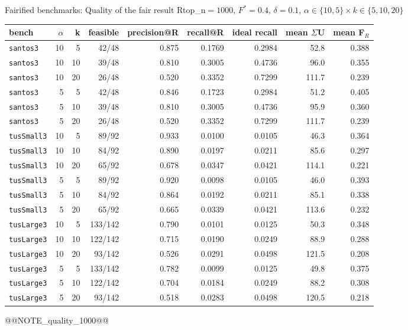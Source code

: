 \begin{frame}{Fairified benchmarks: Quality of the fair result R}{top\_n$=1000$, $F^*{=}0.4$, $\delta{=}0.1$, $\alpha\in\{10,5\}\times k\in\{5,10,20\}$}
\tiny
\begin{center}
\setlength{\tabcolsep}{2.5pt}
\begin{tabular}{lrrrrrrrr}
\toprule
bench & $\alpha$ & k & feasible & precision@R & recall@R & ideal recall & mean $\Sigma$U & mean F$_R$ \\
\midrule
\texttt{santos3} & 10 & 5 & 42/48 & 0.875 & 0.1769 & 0.2984 & 52.8 & 0.388 \\
\texttt{santos3} & 10 & 10 & 39/48 & 0.810 & 0.3005 & 0.4736 & 96.0 & 0.355 \\
\texttt{santos3} & 10 & 20 & 26/48 & 0.520 & 0.3352 & 0.7299 & 111.7 & 0.239 \\
\texttt{santos3} & 5 & 5 & 42/48 & 0.846 & 0.1723 & 0.2984 & 51.2 & 0.405 \\
\texttt{santos3} & 5 & 10 & 39/48 & 0.810 & 0.3005 & 0.4736 & 95.9 & 0.360 \\
\texttt{santos3} & 5 & 20 & 26/48 & 0.520 & 0.3352 & 0.7299 & 111.7 & 0.239 \\
\texttt{tusSmall3} & 10 & 5 & 89/92 & 0.933 & 0.0100 & 0.0105 & 46.3 & 0.364 \\
\texttt{tusSmall3} & 10 & 10 & 84/92 & 0.890 & 0.0197 & 0.0211 & 85.6 & 0.297 \\
\texttt{tusSmall3} & 10 & 20 & 65/92 & 0.678 & 0.0347 & 0.0421 & 114.1 & 0.221 \\
\texttt{tusSmall3} & 5 & 5 & 89/92 & 0.920 & 0.0098 & 0.0105 & 46.0 & 0.393 \\
\texttt{tusSmall3} & 5 & 10 & 84/92 & 0.864 & 0.0192 & 0.0211 & 85.1 & 0.338 \\
\texttt{tusSmall3} & 5 & 20 & 65/92 & 0.665 & 0.0339 & 0.0421 & 113.6 & 0.232 \\
\texttt{tusLarge3} & 10 & 5 & 133/142 & 0.790 & 0.0101 & 0.0125 & 50.3 & 0.348 \\
\texttt{tusLarge3} & 10 & 10 & 122/142 & 0.715 & 0.0190 & 0.0249 & 88.9 & 0.288 \\
\texttt{tusLarge3} & 10 & 20 & 93/142 & 0.526 & 0.0291 & 0.0498 & 121.5 & 0.208 \\
\texttt{tusLarge3} & 5 & 5 & 133/142 & 0.782 & 0.0099 & 0.0125 & 49.8 & 0.375 \\
\texttt{tusLarge3} & 5 & 10 & 122/142 & 0.704 & 0.0184 & 0.0249 & 88.2 & 0.308 \\
\texttt{tusLarge3} & 5 & 20 & 93/142 & 0.518 & 0.0283 & 0.0498 & 120.5 & 0.218 \\
\bottomrule
\end{tabular}
\end{center}
@@NOTE_quality_1000@@
\end{frame}

